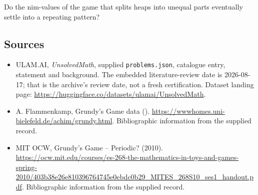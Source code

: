 \documentclass[11pt,a4paper]{article}
\begin{document}
Do the nim-values of the game that splits heaps into unequal parts eventually settle into a repeating pattern?

\subsection{Sources}

{\small

\begin{itemize}

\item[\hypertarget{source:statement:1}{S1}] ULAM.AI, \emph{UnsolvedMath}, supplied \texttt{problems.json}, catalogue entry, statement and background. The embedded literature-review date is 2026-08-17; that is the archive’s review date, not a fresh certification. Dataset landing page: \url{https://huggingface.co/datasets/ulamai/UnsolvedMath}.

\item[\hypertarget{source:statement:2}{S2}] A. Flammenkamp, Grundy's Game data (). \url{https://wwwhomes.uni-bielefeld.de/achim/grundy.html}. Bibliographic information from the supplied record.

\item[\hypertarget{source:statement:3}{S3}] MIT OCW, Grundy's Game -- Periodic? (2010). \url{https://ocw.mit.edu/courses/es-268-the-mathematics-in-toys-and-games-spring-2010/403b38e26e810396764745e0ebdc0b29_MITES_268S10_ses1_handout.pdf}. Bibliographic information from the supplied record.

\end{itemize}

}

\label{end:statement}
\end{document}
